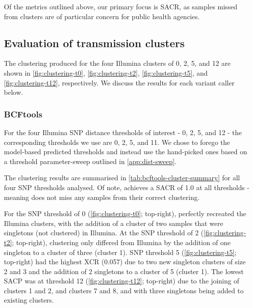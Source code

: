 Of the metrics outlined above, our primary focus is SACR, as samples missed from clusters are of particular concern for public health agencies.

\subsection{Evaluation of transmission clusters}
\label{sec:eval-clusters}

The clustering produced for the four Illumina clusters of 0, 2, 5, and 12 are shown in \autoref{fig:clustering-t0}, \autoref{fig:clustering-t2}, \autoref{fig:clustering-t5}, and \autoref{fig:clustering-t12}, respectively. We discuss the results for each \ont{} variant caller below.

\subsubsection{BCFtools}
\label{sec:bcftools-clustering}

For the four Illumina SNP distance thresholds of interest - 0, 2, 5, and 12 - the corresponding \bcftools{} thresholds we use are 0, 2, 5, and 11. We chose to forego the model-based predicted thresholds and instead use the hand-picked ones based on a threshold parameter-sweep outlined in \autoref{app:dist-sweep}.

The \bcftools{} clustering results are summarised in \autoref{tab:bcftools-cluster-summary} for all four SNP thresholds analysed. Of note, \bcftools{} achieves a SACR of 1.0 at all thresholds - meaning \ont{} does not miss any samples from their correct clustering. 

For the SNP threshold of 0 (\autoref{fig:clustering-t0}; top-right), \bcftools{} perfectly recreated the Illumina clusters, with the addition of a cluster of two samples that were singletons (not clustered) in Illumina. At the SNP threshold of 2 (\autoref{fig:clustering-t2}; top-right), \bcftools{} clustering only differed from Illumina by the addition of one singleton to a cluster of three (cluster 1). SNP threshold 5 (\autoref{fig:clustering-t5}; top-right) had the highest XCR (0.057) due to two new singleton clusters of size 2 and 3 and the addition of 2 singletons to a cluster of 5 (cluster 1). The lowest SACP was at threshold 12 (\autoref{fig:clustering-t12}; top-right) due to the joining of clusters 1 and 2, and clusters 7 and 8, and with three singletons being added to existing clusters. 

